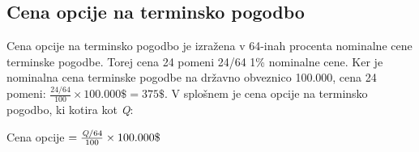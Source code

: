 \documentclass[a4paper]{article}
\begin{document}
\subsection{Cena opcije na terminsko pogodbo}
Cena opcije na terminsko pogodbo je izražena v 64-inah procenta nominalne cene terminske pogodbe. Torej cena 24 pomeni 24/64
1\% nominalne cene. Ker je nominalna cena terminske pogodbe na državno obveznico 100.000\textdollar, cena 24 pomeni:
\(\frac{24/64}{100} \times 100.000\$ = 375\$\). V splošnem je cena opcije na terminsko pogodbo, ki kotira kot \textit{Q}:
\begin{center}
    Cena opcije $ = \frac{\textit{\text{Q}}/64}{100} \times 100.000\$$
\end{center}
\end{document}
